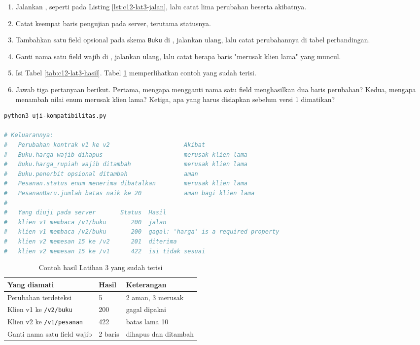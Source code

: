 \begin{enumerate}
  \item Jalankan , seperti pada Listing
        \ref{lst:c12-lat3-jalan}, lalu catat lima perubahan beserta
        akibatnya.
  \item Catat keempat baris pengujian pada server, terutama statusnya.
  \item Tambahkan satu field opsional pada skema \texttt{Buku} di
        , jalankan ulang, lalu catat perubahannya di
        tabel perbandingan.
  \item Ganti nama satu field wajib di , jalankan
        ulang, lalu catat berapa baris "merusak klien lama" yang muncul.
  \item Isi Tabel \ref{tab:c12-lat3-hasil}. Tabel \ref{tab:c12-lat3-contoh}
        memperlihatkan contoh yang sudah terisi.
  \item Jawab tiga pertanyaan berikut. Pertama, mengapa mengganti nama satu
        field menghasilkan dua baris perubahan? Kedua, mengapa menambah nilai
        enum merusak klien lama? Ketiga, apa yang harus disiapkan sebelum
        versi 1 dimatikan?
\end{enumerate}

\begin{lstlisting}[language=bash, caption={Membandingkan kontrak lalu mengujinya, tersedia di \berkas{sources/chapter12/uji-kompatibilitas.py}}, label={lst:c12-lat3-jalan}]
python3 uji-kompatibilitas.py

# Keluarannya:
#   Perubahan kontrak v1 ke v2                     Akibat
#   Buku.harga wajib dihapus                       merusak klien lama
#   Buku.harga_rupiah wajib ditambah               merusak klien lama
#   Buku.penerbit opsional ditambah                aman
#   Pesanan.status enum menerima dibatalkan        merusak klien lama
#   PesananBaru.jumlah batas naik ke 20            aman bagi klien lama
#
#   Yang diuji pada server       Status  Hasil
#   klien v1 membaca /v1/buku       200  jalan
#   klien v1 membaca /v2/buku       200  gagal: 'harga' is a required property
#   klien v2 memesan 15 ke /v2      201  diterima
#   klien v2 memesan 15 ke /v1      422  isi tidak sesuai
\end{lstlisting}

\begin{table}[!htb]
  \centering
  \caption{Contoh hasil Latihan 3 yang sudah terisi}
  \label{tab:c12-lat3-contoh}
  \begin{tabularx}{\textwidth}{Xll}
    \hline
    \textbf{Yang diamati} & \textbf{Hasil} & \textbf{Keterangan} \\
    \hline
    Perubahan terdeteksi & 5 & 2 aman, 3 merusak \\
    \hline
    Klien v1 ke \texttt{/v2/buku} & 200 & gagal dipakai \\
    \hline
    Klien v2 ke \texttt{/v1/pesanan} & 422 & batas lama 10 \\
    \hline
    Ganti nama satu field wajib & 2 baris & dihapus dan ditambah \\
    \hline
  \end{tabularx}
\end{table}

